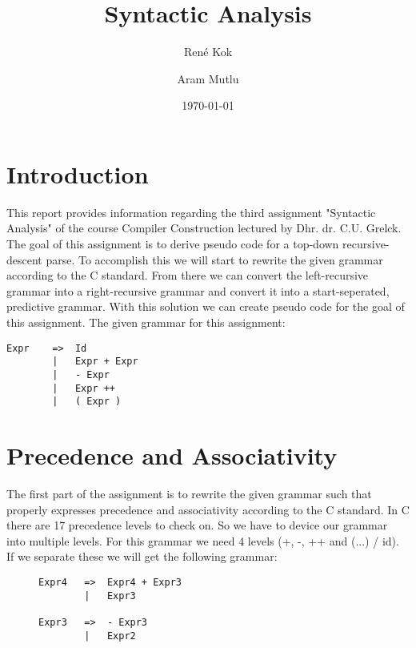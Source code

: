 \documentclass[hidelinks]{uva-inf-article}
\title{Syntactic Analysis}
\author{René Kok}
\author{Aram Mutlu}
\date{\today}
\begin{document}
\maketitle


\section{Introduction}
\begin{flushleft}
\par This report provides information regarding the third assignment 
     "Syntactic Analysis" of the course Compiler Construction lectured by Dhr. dr. C.U. Grelck. 
     The goal of this assignment is to derive pseudo code for a top-down recursive-descent parse. 
     To accomplish this we will start to rewrite the given grammar according to the C standard. 
     From there we can convert the left-recursive grammar into a right-recursive grammar and convert it into a start-seperated, predictive grammar.
     With this solution we can create pseudo code for the goal of this assignment.
     The given grammar for this assignment:
\begin{lstlisting}
Expr    =>  Id
        |   Expr + Expr
        |   - Expr
        |   Expr ++
        |   ( Expr )
\end{lstlisting}
\newpage
\section{Precedence and Associativity}
\par The first part of the assignment is to rewrite the given grammar such that properly
expresses precedence and associativity according to the C standard. In C there are 17 precedence levels to check on.
So we have to device our grammar into multiple levels. For this grammar we need 4 levels (+, -, ++ and (...) / id). 
If we separate these we will get the following grammar:
\begin{figure}[h]
\begin{lstlisting}
Expr4   =>  Expr4 + Expr3 
        |   Expr3

Expr3   =>  - Expr3 
        |   Expr2


\end{lstlisting}
\end{figure}
\end{flushleft}
\end{document}
